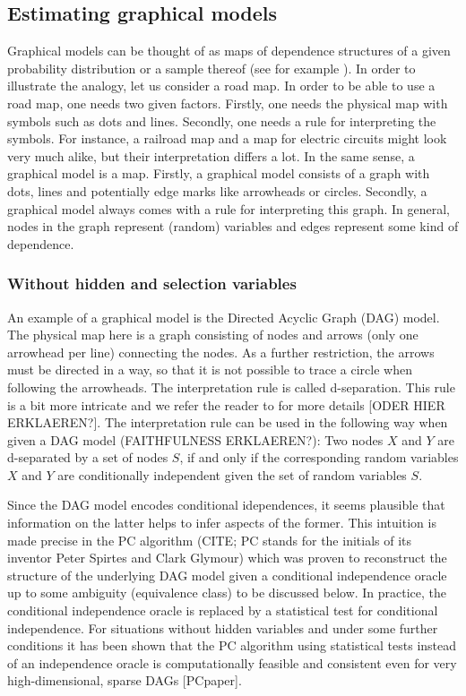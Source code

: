 \documentclass[article]{jss}
\begin{document}
\subsection{Estimating graphical models} \label{sec:gm} 
Graphical models
can be thought of as maps of dependence structures of a given probability
distribution or a sample thereof (see for example \cite{lauritzen}). In
order to illustrate the analogy, let us consider a road map. In order to be
able to use a road map, one needs two given factors. Firstly, one needs the
physical map with symbols such as dots and lines. Secondly, one needs a
rule for interpreting the symbols. For instance, a railroad map and a map
for electric circuits might look very much alike, but their interpretation
differs a lot. In the same sense, a graphical model is a map. Firstly, a
graphical model consists of a graph with dots, lines and potentially edge
marks like arrowheads or circles. Secondly, a graphical model always comes
with a rule for interpreting this graph. In general, nodes in the graph
represent (random) variables and edges represent some kind of dependence.

\subsubsection{Without hidden and selection variables}
An example of a graphical model is the Directed Acyclic Graph (DAG)
model. The physical map here is a graph consisting of nodes and arrows
(only one arrowhead per line) connecting the nodes. As a further
restriction, the arrows must be directed in a way, so that it is not
possible to trace a circle when following the arrowheads. The
interpretation rule is called d-separation. This rule is a bit more
intricate and we refer the reader to \cite{lauritzen} for more details
[ODER HIER ERKLAEREN?]. The interpretation rule can be used in the
following way when given a DAG model (FAITHFULNESS ERKLAEREN?): Two nodes
$X$ and $Y$ are d-separated by a set of nodes $S$, if and only if the
corresponding random variables $X$ and $Y$ are conditionally independent
given the set of random variables $S$.

Since the DAG model encodes conditional idependences, it seems plausible
that information on the latter helps to infer aspects of the former. This
intuition is made precise in the PC algorithm (CITE; PC stands for the
initials of its inventor Peter Spirtes and Clark Glymour) which was proven
to reconstruct the structure of the underlying DAG model given a
conditional independence oracle up to some ambiguity (equivalence class)
to be discussed below. In practice, the conditional independence oracle is
replaced by a statistical test for conditional independence. For situations
without hidden variables and under some further conditions it has been
shown that the PC algorithm using statistical tests instead of an
independence oracle is computationally feasible and consistent even for very
high-dimensional, sparse DAGs [PCpaper]. 
\end{document}

